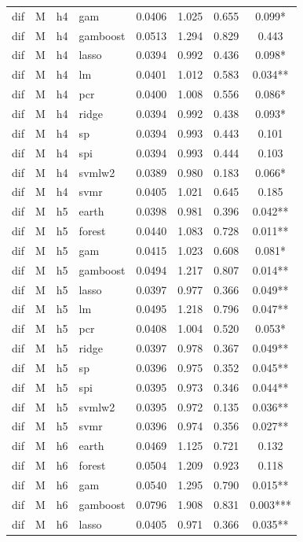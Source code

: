 \begin{ThreePartTable}
\begin{longtable}[t]{llclcccc}
dif & M & h4 & gam & 0.0406 & 1.025 & 0.655 & 0.099*\\
dif & M & h4 & gamboost & 0.0513 & 1.294 & 0.829 & 0.443\\
dif & M & h4 & lasso & 0.0394 & 0.992 & 0.436 & 0.098*\\
dif & M & h4 & lm & 0.0401 & 1.012 & 0.583 & 0.034**\\
dif & M & h4 & pcr & 0.0400 & 1.008 & 0.556 & 0.086*\\
dif & M & h4 & ridge & 0.0394 & 0.992 & 0.438 & 0.093*\\
dif & M & h4 & sp & 0.0394 & 0.993 & 0.443 & 0.101\\
dif & M & h4 & spi & 0.0394 & 0.993 & 0.444 & 0.103\\
dif & M & h4 & svmlw2 & 0.0389 & 0.980 & 0.183 & 0.066*\\
dif & M & h4 & svmr & 0.0405 & 1.021 & 0.645 & 0.185\\
\addlinespace
dif & M & h5 & earth & 0.0398 & 0.981 & 0.396 & 0.042**\\
dif & M & h5 & forest & 0.0440 & 1.083 & 0.728 & 0.011**\\
dif & M & h5 & gam & 0.0415 & 1.023 & 0.608 & 0.081*\\
dif & M & h5 & gamboost & 0.0494 & 1.217 & 0.807 & 0.014**\\
dif & M & h5 & lasso & 0.0397 & 0.977 & 0.366 & 0.049**\\
dif & M & h5 & lm & 0.0495 & 1.218 & 0.796 & 0.047**\\
dif & M & h5 & pcr & 0.0408 & 1.004 & 0.520 & 0.053*\\
dif & M & h5 & ridge & 0.0397 & 0.978 & 0.367 & 0.049**\\
dif & M & h5 & sp & 0.0396 & 0.975 & 0.352 & 0.045**\\
dif & M & h5 & spi & 0.0395 & 0.973 & 0.346 & 0.044**\\
dif & M & h5 & svmlw2 & 0.0395 & 0.972 & 0.135 & 0.036**\\
dif & M & h5 & svmr & 0.0396 & 0.974 & 0.356 & 0.027**\\
\addlinespace
dif & M & h6 & earth & 0.0469 & 1.125 & 0.721 & 0.132\\
dif & M & h6 & forest & 0.0504 & 1.209 & 0.923 & 0.118\\
dif & M & h6 & gam & 0.0540 & 1.295 & 0.790 & 0.015**\\
dif & M & h6 & gamboost & 0.0796 & 1.908 & 0.831 & 0.003***\\
dif & M & h6 & lasso & 0.0405 & 0.971 & 0.366 & 0.035**\\

\end{longtable}
\end{ThreePartTable}
